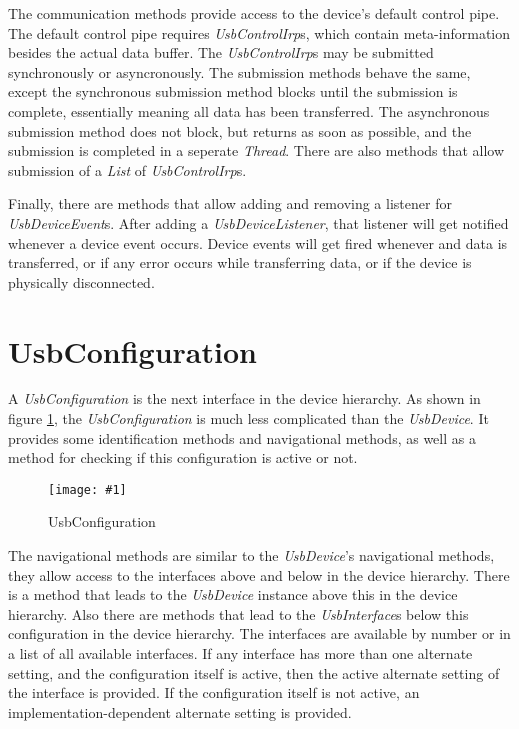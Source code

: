 \documentclass{article}
\newcommand{\myclass}[1]{\emph{#1}}
\newcommand{\myinterface}[1]{\emph{#1}}
\newcommand{\mysectionend}[0]{\vfill\pagebreak[1]}
\newcommand{\myfigure}[3]{\begin{figure}[htbp]\centering\texttt{[image: \#1]}\caption{#2}\label{#3}\end{figure}}
\begin{document}
The communication methods provide access to the device's default control
pipe.  The default control pipe requires \myinterface{UsbControlIrp}s, which contain
meta-information besides the actual data buffer.  The \myinterface{UsbControlIrp}s
may be submitted synchronously or asyncronously.  The submission methods
behave the same, except the synchronous submission method blocks until
the submission is complete, essentially meaning all data has been transferred.
The asynchronous submission method does not block, but returns as soon as
possible, and the submission is completed in a seperate \myclass{Thread}.  There
are also methods that allow submission of a \myinterface{List} of \myinterface{UsbControlIrp}s.

Finally, there are methods that allow adding and removing a listener for
\myclass{UsbDeviceEvent}s.  After adding a \myinterface{UsbDeviceListener}, that listener will
get notified whenever a device event occurs.  Device events will get
fired whenever and data is transferred, or if any error occurs while
transferring data, or if the device is physically disconnected.

\mysectionend


\section{UsbConfiguration}

A \myinterface{UsbConfiguration} is the next interface in the device hierarchy.
As shown in figure \ref{UsbConfiguration}, the \myinterface{UsbConfiguration}
is much less complicated than the \myinterface{UsbDevice}.  It provides some
identification methods and navigational methods, as well as a
method for checking if this configuration is active or not.

\myfigure{figs/UsbConfiguration}{UsbConfiguration}{UsbConfiguration}

The navigational methods are similar to the \myinterface{UsbDevice}'s navigational
methods, they allow access to the interfaces above and below in the
device hierarchy.  There is a method that leads to the \myinterface{UsbDevice}
instance above this in the device hierarchy.  Also there are methods
that lead to the \myinterface{UsbInterface}s below this configuration in the device
hierarchy.  The interfaces are available by number or in a list of all
available interfaces.  If any interface has more than one alternate
setting, and the configuration itself is active, then the active
alternate setting of the interface is provided.  If the configuration
itself is not active, an implementation-dependent alternate setting
is provided.
\end{document}

